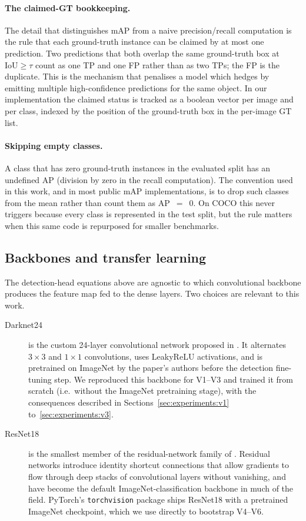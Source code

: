 \paragraph{The claimed-GT bookkeeping.} The detail that distinguishes mAP
from a naive precision/recall computation is the rule that each ground-truth
instance can be claimed by at most one prediction. Two predictions that both
overlap the same ground-truth box at $\mathrm{IoU} \ge \tau$ count as one TP
and one FP rather than as two TPs; the FP is the duplicate. This is the
mechanism that penalises a model which hedges by emitting multiple
high-confidence predictions for the same object. In our implementation the
claimed status is tracked as a boolean vector per image and per class,
indexed by the position of the ground-truth box in the per-image GT list.

\paragraph{Skipping empty classes.} A class that has zero ground-truth
instances in the evaluated split has an undefined AP (division by zero in
the recall computation). The convention used in this work, and in most
public mAP implementations, is to drop such classes from the mean rather
than count them as AP~$=$~$0$. On COCO this never triggers because every
class is represented in the test split, but the rule matters when this same
code is repurposed for smaller benchmarks.

\subsection{Backbones and transfer learning}
\label{sec:theory:backbone}

The detection-head equations above are agnostic to which convolutional
backbone produces the feature map fed to the dense layers. Two
choices are relevant to this work.

\begin{description}
    \item[Darknet24] is the custom 24-layer convolutional network proposed in
        \citet{redmon2016you}. It alternates $3\!\times\!3$ and
        $1\!\times\!1$ convolutions, uses LeakyReLU activations, and is
        pretrained on ImageNet by the paper's authors before the detection
        fine-tuning step. We reproduced this backbone for V1--V3 and trained
        it from scratch (i.e.\ without the ImageNet pretraining stage), with
        the consequences described in Sections~\ref{sec:experiments:v1}
        to~\ref{sec:experiments:v3}.
    \item[ResNet18] is the smallest member of the residual-network family of
        \citet{he2016deep}. Residual networks introduce identity shortcut
        connections that allow gradients to flow through deep stacks of
        convolutional layers without vanishing, and have become the default
        ImageNet-classification backbone in much of the field. PyTorch's
        \texttt{torchvision} package ships ResNet18 with a pretrained
        ImageNet checkpoint, which we use directly to bootstrap V4--V6.
\end{description}

